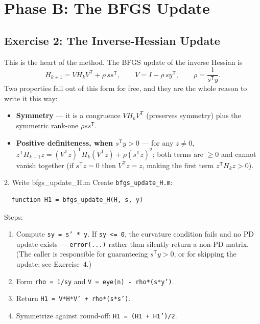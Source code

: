 \documentclass[11pt,letterpaper]{article}
\newcommand{\T}{^{\mathsf{T}}}
\begin{document}
\section{Phase B: The BFGS Update}

\subsection{Exercise 2: The Inverse-Hessian Update}

This is the heart of the method. The BFGS update of the inverse Hessian is
\begin{equation}\label{eq:bfgsH}
H_{k+1}=V H_k V\T+\rho\,s s\T,
\qquad V=I-\rho\,s y\T,\qquad \rho=\frac1{s\T y}.
\end{equation}
Two properties fall out of this form for free, and they are the whole reason to write
it this way:
\begin{itemize}[nosep]
  \item \textbf{Symmetry} --- it is a congruence $V H_k V\T$ (preserves symmetry)
    plus the symmetric rank-one $\rho ss\T$.
  \item \textbf{Positive definiteness, when $s\T y>0$} --- for any $z\neq0$,
    $z\T H_{k+1}z=(V\T z)\T H_k(V\T z)+\rho(s\T z)^2$; both terms are $\ge0$ and
    cannot vanish together (if $s\T z=0$ then $V\T z=z$, making the first term
    $z\T H_k z>0$).
\end{itemize}

\begin{exercise}{2. Write bfgs\_update\_H.m}
Create \texttt{bfgs\_update\_H.m}:
\begin{verbatim}
  function H1 = bfgs_update_H(H, s, y)
\end{verbatim}
Steps:
\begin{enumerate}[nosep]
  \item Compute \texttt{sy = s' * y}. If \texttt{sy <= 0}, the curvature condition
    fails and no PD update exists --- \texttt{error(...)} rather than silently return
    a non-PD matrix. (The caller is responsible for guaranteeing $s\T y>0$, or for
    skipping the update; see Exercise~4.)
  \item Form \texttt{rho = 1/sy} and \texttt{V = eye(n) - rho*(s*y')}.
  \item Return \texttt{H1 = V*H*V' + rho*(s*s')}.
  \item Symmetrize against round-off: \texttt{H1 = (H1 + H1')/2}.
\end{enumerate}
\end{exercise}
\end{document}
